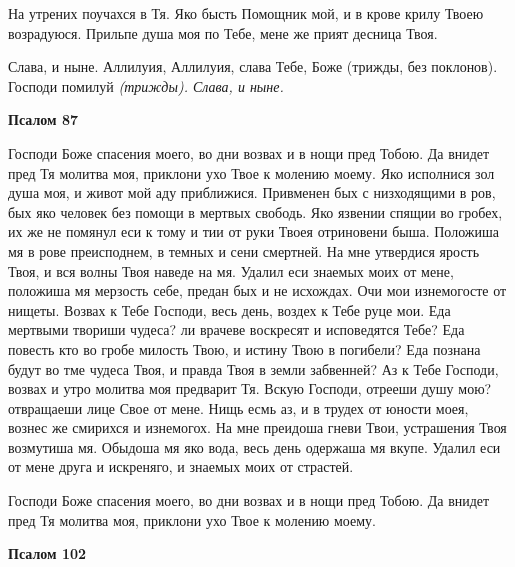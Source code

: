На утрених поучахся в Тя. Яко бысть Помощник мой, и в крове крилу Твоею возрадуюся. Прильпе душа моя по Тебе, мене же прият десница Твоя.


Слава, и ныне. Аллилуия, Аллилуия, слава Тебе, Боже (трижды, без поклонов). Господи помилуй \itshape (трижды)\normalfont{}. Слава, и ныне.





\bfseries Псалом 87\normalfont{}


Господи Боже спасения моего, во дни возвах и в нощи пред Тобою. Да внидет пред Тя молитва моя, приклони ухо Твое к молению моему. Яко исполнися зол душа моя, и живот мой аду приближися. Привменен бых с низходящими в ров, бых яко человек без помощи в мертвых свободь. Яко язвении спящии во гробех, их же не помянул еси к тому и тии от руки Твоея отриновени быша. Положиша мя в рове преисподнем, в темных и сени смертней. На мне утвердися ярость Твоя, и вся волны Твоя наведе на мя. Удалил еси знаемых моих от мене, положиша мя мерзость себе, предан бых и не исхождах. Очи мои изнемогосте от нищеты. Возвах к Тебе Господи, весь день, воздех к Тебе руце мои. Еда мертвыми твориши чудеса? ли врачеве воскресят и исповедятся Тебе? Еда повесть кто во гробе милость Твою, и истину Твою в погибели? Еда познана будут во тме чудеса Твоя, и правда Твоя в земли забвенней? Аз к Тебе Господи, возвах и утро молитва моя предварит Тя. Вскую Господи, отрееши душу мою? отвращаеши лице Свое от мене. Нищь есмь аз, и в трудех от юности моея, вознес же смирихся и изнемогох. На мне преидоша гневи Твои, устрашения Твоя возмутиша мя. Обыдоша мя яко вода, весь день одержаша мя вкупе. Удалил еси от мене друга и искреняго, и знаемых моих от страстей.


Господи Боже спасения моего, во дни возвах и в нощи пред Тобою. Да внидет пред Тя молитва моя, приклони ухо Твое к молению моему.





\bfseries Псалом 102\normalfont{}


